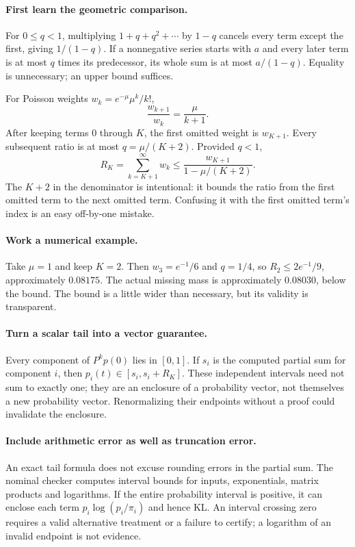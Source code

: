 \documentclass[11pt]{article}
\begin{document}
\paragraph{First learn the geometric comparison.}
For $0\leq q<1$, multiplying $1+q+q^2+\cdots$ by $1-q$ cancels every
term except the first, giving $1/(1-q)$. If a nonnegative series starts with
$a$ and every later term is at most $q$ times its predecessor, its whole sum
is at most $a/(1-q)$. Equality is unnecessary; an upper bound suffices.

For Poisson weights $w_k=e^{-\mu}\mu^k/k!$,
\[
 \frac{w_{k+1}}{w_k}=\frac{\mu}{k+1}.
\]
After keeping terms $0$ through $K$, the first omitted weight is $w_{K+1}$.
Every subsequent ratio is at most $q=\mu/(K+2)$. Provided $q<1$,
\[
 R_K=\sum_{k=K+1}^\infty w_k
 \leq\frac{w_{K+1}}{1-\mu/(K+2)}.
\]
The $K+2$ in the denominator is intentional: it bounds the ratio from the
first omitted term to the next omitted term. Confusing it with the first
omitted term's index is an easy off-by-one mistake.

\paragraph{Work a numerical example.}
Take $\mu=1$ and keep $K=2$. Then $w_3=e^{-1}/6$ and $q=1/4$, so
$R_2\leq 2e^{-1}/9$, approximately $0.08175$. The actual missing mass
is approximately $0.08030$, below the bound. The bound is a little wider
than necessary, but its validity is transparent.

\paragraph{Turn a scalar tail into a vector guarantee.}
Every component of $P^kp(0)$ lies in $[0,1]$. If $s_i$ is the computed
partial sum for component $i$, then $p_i(t)\in[s_i,s_i+R_K]$.
These independent intervals need not sum to exactly one; they are an
enclosure of a probability vector, not themselves a new probability vector.
Renormalizing their endpoints without a proof could invalidate the enclosure.

\paragraph{Include arithmetic error as well as truncation error.}
An exact tail formula does not excuse rounding errors in the partial sum.
The nominal checker computes interval bounds for inputs, exponentials,
matrix products and logarithms. If the entire probability interval is
positive, it can enclose each term $p_i\log(p_i/\pi_i)$ and hence KL.
An interval crossing zero requires a valid alternative treatment or a
failure to certify; a logarithm of an invalid endpoint is not evidence.
\end{document}
